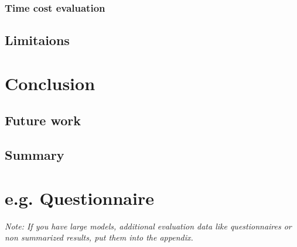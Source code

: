 \documentclass[a4paper,12pt,twoside]{report}
\begin{document}
\subsection{Time cost evaluation}

\section{Limitaions}






\chapter{Conclusion}
\section{Future work}
\section{Summary}






\appendix

\chapter{e.g. Questionnaire}

\textit{Note: If you have large models, additional evaluation data like questionnaires or non summarized results, put them into the appendix.}


\clearpage

\clearpage

\listoftables
\clearpage


%

\end{document}
